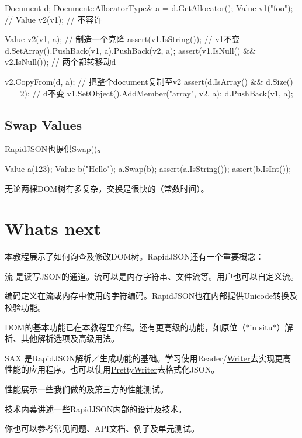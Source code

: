 \begin{DoxyCode}
\hyperlink{class_generic_document}{Document} d;
\hyperlink{class_generic_document_a35155b912da66ced38d22e2551364c57}{Document::AllocatorType}& a = d.\hyperlink{class_generic_document_aa4609d6b19f86aec1a6b96edf2c27686}{GetAllocator}();
\hyperlink{class_generic_value}{Value} v1(\textcolor{stringliteral}{"foo"});
\textcolor{comment}{// Value v2(v1); // 不容许}

\hyperlink{class_generic_value}{Value} v2(v1, a);                      \textcolor{comment}{// 制造一个克隆}
assert(v1.IsString());                \textcolor{comment}{// v1不变}
d.SetArray().PushBack(v1, a).PushBack(v2, a);
assert(v1.IsNull() && v2.IsNull());   \textcolor{comment}{// 两个都转移动d}

v2.CopyFrom(d, a);                    \textcolor{comment}{// 把整个document复制至v2}
assert(d.IsArray() && d.Size() == 2); \textcolor{comment}{// d不变}
v1.SetObject().AddMember(\textcolor{stringliteral}{"array"}, v2, a);
d.PushBack(v1, a);
\end{DoxyCode}
\hypertarget{md_Commun_Externe_RapidJSON_doc_tutorial.zh-cn_SwapValues}{}\subsection{Swap Values}\label{md_Commun_Externe_RapidJSON_doc_tutorial.zh-cn_SwapValues}
Rapid\+J\+S\+O\+N也提供{\ttfamily Swap()}。


\begin{DoxyCode}
\hyperlink{class_generic_value}{Value} a(123);
\hyperlink{class_generic_value}{Value} b(\textcolor{stringliteral}{"Hello"});
a.Swap(b);
assert(a.IsString());
assert(b.IsInt());
\end{DoxyCode}


无论两棵\+D\+O\+M树有多复杂，交换是很快的（常数时间）。\hypertarget{md_Commun_Externe_RapidJSON_doc_tutorial.zh-cn_WhatsNext}{}\section{What\textquotesingle{}s next}\label{md_Commun_Externe_RapidJSON_doc_tutorial.zh-cn_WhatsNext}
本教程展示了如何询查及修改\+D\+O\+M树。\+Rapid\+J\+S\+O\+N还有一个重要概念：


\begin{DoxyEnumerate}
\item 流 是读写\+J\+S\+O\+N的通道。流可以是内存字符串、文件流等。用户也可以自定义流。
\item 编码定义在流或内存中使用的字符编码。\+Rapid\+J\+S\+O\+N也在内部提供\+Unicode转换及校验功能。
\item D\+OM的基本功能已在本教程里介绍。还有更高级的功能，如原位（$\ast$in situ$\ast$）解析、其他解析选项及高级用法。
\item S\+AX 是\+Rapid\+J\+S\+O\+N解析／生成功能的基础。学习使用{\ttfamily Reader}/{\ttfamily \hyperlink{class_writer}{Writer}}去实现更高性能的应用程序。也可以使用{\ttfamily \hyperlink{class_pretty_writer}{Pretty\+Writer}}去格式化\+J\+S\+O\+N。
\item 性能展示一些我们做的及第三方的性能测试。
\item 技术内幕讲述一些\+Rapid\+J\+S\+O\+N内部的设计及技术。
\end{DoxyEnumerate}

你也可以参考常见问题、\+A\+P\+I文档、例子及单元测试。 